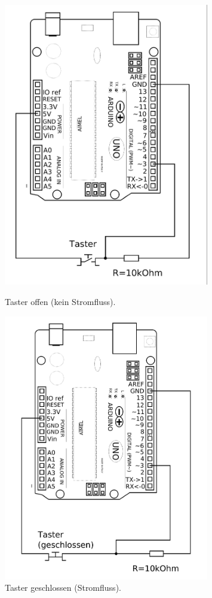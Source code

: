 \begin{figure}[H]
	\hfill
	\begin{minipage}{0.4\textwidth}
		\includegraphics[width=0.8\textwidth]{Zeichnungen/taster-an-arduino.png}
		\caption{Taster offen (kein Stromfluss).}
	\end{minipage}
	\hfill
	\begin{minipage}{0.4\textwidth}
		\includegraphics[width=0.8\textwidth]{Zeichnungen/taster-an-arduino-geschlossen.png}
		\caption{Taster geschlossen (Stromfluss).}
	\end{minipage}
	\hfill
	\label{abb:schaltplan-taster}
\end{figure}

